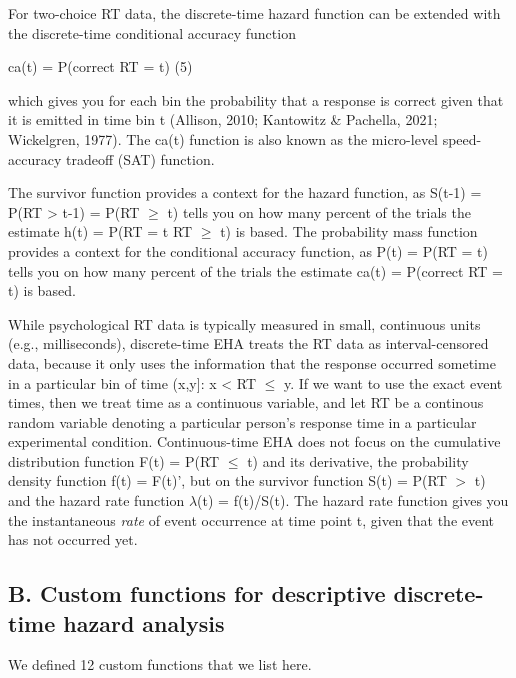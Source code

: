 \documentclass[
  man, donotrepeattitle,floatsintext]{apa6}
\begin{document}
For two-choice RT data, the discrete-time hazard function can be extended with the discrete-time conditional accuracy function

\noindent ca(t) = P(correct \textbar{} RT = t) \hfill  (5)

\noindent which gives you for each bin the probability that a response is correct given that it is emitted in time bin t (Allison, 2010; Kantowitz \& Pachella, 2021; Wickelgren, 1977). The ca(t) function is also known as the micro-level speed-accuracy tradeoff (SAT) function.

The survivor function provides a context for the hazard function, as S(t-1) = P(RT \textgreater{} t-1) = P(RT \(\geq\) t) tells you on how many percent of the trials the estimate h(t) = P(RT = t\textbar{} RT \(\geq\) t) is based. The probability mass function provides a context for the conditional accuracy function, as P(t) = P(RT = t) tells you on how many percent of the trials the estimate ca(t) = P(correct \textbar{} RT = t) is based.

While psychological RT data is typically measured in small, continuous units (e.g., milliseconds), discrete-time EHA treats the RT data as interval-censored data, because it only uses the information that the response occurred sometime in a particular bin of time (x,y{]}: x \textless{} RT \(\leq\) y. If we want to use the exact event times, then we treat time as a continuous variable, and let RT be a continous random variable denoting a particular person's response time in a particular experimental condition. Continuous-time EHA does not focus on the cumulative distribution function F(t) = P(RT \(\leq\) t) and its derivative, the probability density function f(t) = F(t)', but on the survivor function S(t) = P(RT \(>\) t) and the hazard rate function \(\lambda\)(t) = f(t)/S(t). The hazard rate function gives you the instantaneous \emph{rate} of event occurrence at time point t, given that the event has not occurred yet.

\subsection{B. Custom functions for descriptive discrete-time hazard analysis}\label{b.-custom-functions-for-descriptive-discrete-time-hazard-analysis}

We defined 12 custom functions that we list here.
\end{document}
